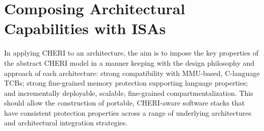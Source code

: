 %
%
%

\section{Composing Architectural Capabilities with ISAs}\label{CAP-ISAs}

In applying CHERI to an architecture, the aim is to impose the key properties
of the abstract CHERI model in a manner keeping with the design philosophy and
approach of each architecture: strong compatibility with MMU-based, C-language
TCBs; strong fine-grained memory protection supporting language properties;
and incrementally deployable, scalable, fine-grained compartmentalization.
This should allow the construction of portable, CHERI-aware software stacks
that have consistent protection properties across a range of underlying
architectures and architectural integration strategies.

